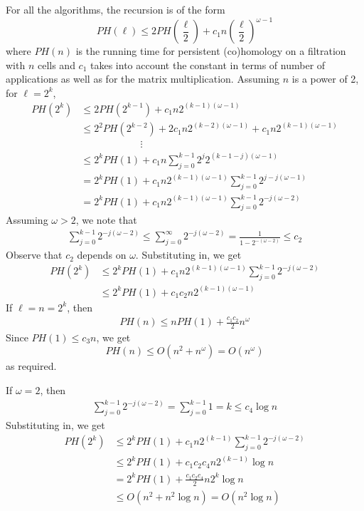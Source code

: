 \documentclass{article}
\newcommand{\matexp}{\omega}
\newcommand{\PH}{PH}
\begin{document}
For all the algorithms, the recursion is of the form
\[ \PH(\ell) \leq  2\PH\left(\frac{\ell}{2}\right) +c_1 n \left(\frac{\ell}{2}\right)^{\matexp-1} \]
where $\PH(n)$ is the running time for persistent (co)homology on a filtration with $n$ cells and
 $c_1$ takes into account the constant in terms of number of applications as well as for the matrix multiplication. 
Assuming $n$ is a power of 2, for $\ell = 2^k$,
\begin{align*}
 \PH(2^k) &\leq  2\PH(2^{k-1}) +c_1 n 2^{(k-1)(\matexp-1)} \\
 &\leq  2^2 \PH(2^{k-2})+2 c_1 n 2^{(k-2)(\matexp-1)} +c_1 n 2^{(k-1)(\matexp-1)}\\
 &\qquad\qquad\qquad\vdots\\
 &\leq  2^k \PH(1) + c_1 n \sum\limits_{j=0}^{k-1}2^{j}2^{(k-1-j)(\matexp-1)}\\
 & =  2^k \PH(1) + c_1 n 2^{(k-1)(\matexp-1)} \sum\limits_{j=0}^{k-1}2^{j-j(\matexp-1)}\\
 & =  2^k \PH(1) + c_1 n 2^{(k-1)(\matexp-1)} \sum\limits_{j=0}^{k-1}2^{-j(\matexp-2)}
 \end{align*}
Assuming $\matexp>2$, we note that 
\begin{align*}
\sum\limits_{j=0}^{k-1}2^{-j(\matexp-2)} \leq \sum\limits_{j=0}^{\infty}2^{-j(\matexp-2)} 
= \frac{1}{1-2^{-(\matexp-2)}} \leq c_2
 \end{align*}
 Observe that $c_2$ depends on $\matexp$.
 Substituting in, we get
 \begin{align*}
 \PH(2^k) &\leq  2^k \PH(1) + c_1 n 2^{(k-1)(\matexp-1)} \sum\limits_{j=0}^{k-1}2^{-j(\matexp-2)} \\
 &\leq 2^k \PH(1) + c_1 c_2 n 2^{(k-1)(\matexp-1)}
 \end{align*}
If $\ell = n = 2^k$, then
\begin{align*}
\PH(n) \leq n \PH(1) +\frac{c_1 c_2}{2} n^{\matexp} 
\end{align*}
Since $\PH(1)\leq  c_3 n$, we get
\[\PH(n) \leq O(n^2 + n^{\matexp}) = O(n^{\matexp})\]
as required. 

If $\matexp=2$, then 
\begin{align*}
\sum\limits_{j=0}^{k-1}2^{-j(\matexp-2)} =  \sum\limits_{j=0}^{k-1} 1 
 =   k  \leq c_4 \log n
 \end{align*}
 Substituting in, we get 
 \begin{align*}
 \PH(2^k) &\leq  2^k \PH(1) + c_1 n 2^{(k-1)} \sum\limits_{j=0}^{k-1}2^{-j(\matexp-2)} \\
 &\leq 2^k \PH(1) + c_1 c_2 c_4 n 2^{(k-1)} \log n\\
 &=  2^k \PH(1) + \frac{c_1 c_2 c_4}{2} n 2^{k} \log n\\
 & \leq O(n^{2}+n^2 \log n ) =  O(n^2 \log n) 
 \end{align*}
\end{document}
